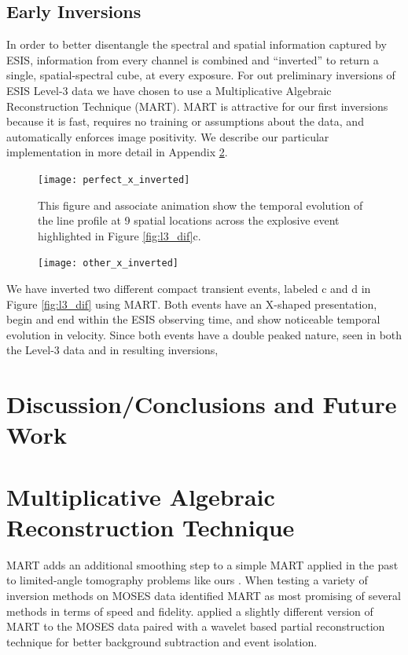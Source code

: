     
    \subsection{Early Inversions}
    	In order to better disentangle the spectral and spatial information captured by ESIS, information from every channel is combined and ``inverted'' to return a single, spatial-spectral cube, at every exposure.
    	For out preliminary inversions of ESIS Level-3 data we have chosen to use a Multiplicative Algebraic Reconstruction Technique (MART).
    	MART is attractive for our first inversions because it is fast, requires no training or assumptions about the data, and automatically enforces image  positivity.
    	We describe our particular implementation in more detail in Appendix \ref{MART}.
    	
    	\begin{figure}[htb!]
    		\texttt{[image: perfect\_x\_inverted]}
    		\centering
    		\caption{This figure and associate animation show the temporal evolution of the \ov line profile at 9 spatial locations across the explosive event highlighted in Figure \ref{fig:l3_dif}c.}
    		\label{fig:perfect_x_inverted}
    	\end{figure}
        
        \begin{figure}[htb!]
    	\texttt{[image: other\_x\_inverted]}
    	\centering
    	\caption{}
    	\label{fig:other_x_inverted}
    \end{figure}
    	
    	We have inverted two different compact transient events, labeled c and d in Figure \ref{fig:l3_dif} using MART.
    	Both events have an X-shaped presentation, begin and end within the ESIS observing time, and show noticeable temporal evolution in velocity.
    	Since both events have a double peaked nature, seen in both the Level-3 data and in resulting inversions, 
    	
    	
    			
    		   	
    	
\section{Discussion/Conclusions and Future Work}





\appendix
\section{Multiplicative Algebraic Reconstruction Technique}\label{MART}
	MART adds an additional smoothing step to a simple MART applied in the past to limited-angle tomography problems like ours \citep{Okamoto1991,Verhoeven1993}.
	When testing a variety of inversion methods on MOSES data \citet{FoxPhD} identified MART as most promising of several methods in terms of speed and fidelity.
	\citet{RustPhD} applied a slightly different version of MART to the MOSES data paired with a wavelet based partial reconstruction technique for better background subtraction and event isolation.
	
